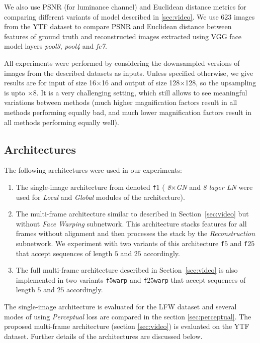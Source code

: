 We also use PSNR (for luminance channel) and Euclidean distance metrics for comparing different variants of model described in \ref{sec:video}. We use $623$ images from the YTF dataset to compare PSNR and Euclidean distance between features of ground truth and reconstructed images extracted using VGG face model layers \emph{pool3}, \emph{pool4} and \emph{fc7}.

All experiments were performed by considering the downsampled versions of images from the described datasets as inputs. Unless specified otherwise, we give results are for input of size 16$\times$16 and output of size 128$\times$128, so the upsampling is upto $\times$8. It is a very challenging setting, which still allows to see meaningful variations between methods (much higher magnification factors result in all methods performing equally bad, and much lower magnification factors result in all methods performing equally well).

\subsection{Architectures}

\label{sec:arch}
The following architectures were used in our experiments:
\begin{enumerate}
    \item The single-image architecture from \cite{TuzelTH16} denoted \texttt{f$1$} ( \emph{8$\times$GN} and  \emph{8 layer LN} were used for \emph{Local} and \emph{Global} modules of the architecture).
    \item The multi-frame architecture similar to described in Section~\ref{sec:video} but without \emph{Face Warping} subnetwork. This architecture stacks features for all frames  without alignment and then processes the stack by the \emph{Reconstruction} subnetwork. We experiment with two variants of this architecture \texttt{f$5$} and \texttt{f$25$} that accept sequences of length $5$ and $25$ accordingly.
    \item The full multi-frame architecture described in Section~\ref{sec:video} is also implemented in two variants \texttt{f$5$warp} and \texttt{f$25$warp} that accept sequences of length $5$ and $25$ accordingly.
\end{enumerate} 
The single-image architecture \cite{TuzelTH16} is evaluated for the LFW dataset and several modes of using \emph{Perceptual} loss are compared in the section \ref{sec:perceptual}.
The proposed multi-frame architecture (section \ref{sec:video}) is evaluated on the YTF dataset.
Further details of the architectures are discussed below.



